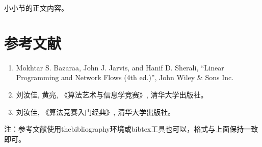 \documentclass{noithesis}
\begin{document}
小小节的正文内容。

\section*{参考文献}
\begin{enumerate}[\lbrack 1\rbrack]
\item Mokhtar S. Bazaraa, John J. Jarvis, and Hanif D. Sherali, ``Linear Programming and Network Flows (4th ed.)'', John Wiley \& Sons Inc.
\item 刘汝佳, 黄亮, 《算法艺术与信息学竞赛》, 清华大学出版社。
\item 刘汝佳, 《算法竞赛入门经典》, 清华大学出版社。
\end{enumerate}

注：参考文献使用thebibliography环境或bibtex工具也可以，格式与上面保持一致即可。

\end{document}
